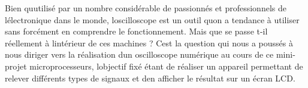 Bien qu\textquotesingle{}utilisé par un nombre considérable de passionnés et professionnels de l\textquotesingle{}électronique dans le monde, l\textquotesingle{}oscilloscope est un outil qu\textquotesingle{}on a tendance à utiliser sans forcément en comprendre le fonctionnement. Mais que se passe t-\/il réellement à l\textquotesingle{}intérieur de ces machines ? C\textquotesingle{}est la question qui nous a poussés à nous diriger vers la réalisation d\textquotesingle{}un oscilloscope numérique au cours de ce mini-\/projet microprocesseurs, l\textquotesingle{}objectif fixé étant de réaliser un appareil permettant de relever différents types de signaux et d\textquotesingle{}en afficher le résultat sur un écran L\+C\+D. 
